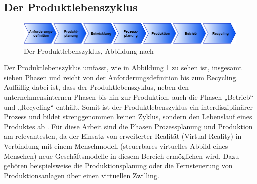 \subsection{Der Produktlebenszyklus}\label{sec:Produktlebenszyklus}
\begin{figure}[h]
	\centering
	\includegraphics[width=1\linewidth]{Bilder/A8_Produktlebenszyklus}
	\caption{Der Produktlebenszyklus, Abbildung nach \cite[S.3]{13}}
	\label{fig:Produktlebenszyklus}
\end{figure}
\noindent Der Produktlebenszyklus umfasst, wie in Abbildung \ref{fig:Produktlebenszyklus} zu sehen ist, insgesamt sieben Phasen und reicht von der Anforderungsdefinition bis zum Recycling. Auffällig dabei ist, dass der Produktlebenszyklus, neben den unternehmensinternen Phasen bis hin zur Produktion, auch die Phasen „Betrieb“ und „Recycling“ enthält. Somit ist der Produktlebenszyklus ein interdisziplinärer Prozess und bildet strenggenommen keinen Zyklus, sondern den Lebenslauf eines Produktes ab \cite[S.3]{13}.
\newline
Für diese Arbeit sind die Phasen Prozessplanung und Produktion am relevantesten, da der Einsatz von erweiterter Realität (Virtual Reality) in Verbindung mit einem Menschmodell (steuerbares virtuelles Abbild eines Menschen) neue Geschäftsmodelle in diesem Bereich ermöglichen wird. Dazu gehören beispielsweise die Produktionsplanung oder die Fernsteuerung von Produktionsanlagen über einen virtuellen Zwilling.

